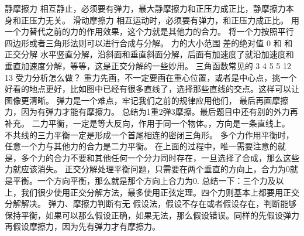 {}静摩擦力 相互静止，必须要有弹力，最大静摩擦力和正压力成正比，静摩擦力本身和正压力无关。\markdownRendererParagraphSeparator
{}滑动摩擦力 相互运动时，必须要有弹力，和正压力成正比。\markdownRendererInterblockSeparator
{}
\markdownRendererSectionEnd \markdownRendererSectionBegin
{}\markdownRendererInterblockSeparator
{}用一个力替代之前的力的作用效果，这个力就是其他力的合力。\markdownRendererSoftLineBreak
{}将一个力按照平行四边形或者三角形法则可以进行合成与分解。\markdownRendererSoftLineBreak
{}力的大小范围 差的绝对值 0 和 和\markdownRendererParagraphSeparator
{}正交分解\markdownRendererParagraphSeparator
{}水平竖直分解，沿斜面和垂直斜面分解，后面有加速度了就沿加速度和垂直加速度分解，等等，这是正交分解的一些妙用。\markdownRendererParagraphSeparator
{}三角函数常见的\markdownRendererParagraphSeparator
{}3 4 5\markdownRendererSoftLineBreak
{}5 12 13\markdownRendererInterblockSeparator
{}
\markdownRendererSectionEnd \markdownRendererSectionBegin
{}\markdownRendererInterblockSeparator
{}受力分析怎么做？\markdownRendererParagraphSeparator
{}重力先画，不一定要画在重心位置，或者是中心点，挑一个好看的地点更好，比如图中已经有很多直线了，选择那些直线的交点。这样可以让图像更清晰。\markdownRendererParagraphSeparator
{}弹力是一个难点，牢记我们之前的规律应用他们，\markdownRendererParagraphSeparator
{}最后再画摩擦力，因为有弹力才能有摩擦力。\markdownRendererParagraphSeparator
{}总结为1重2弹3摩擦。最后题目中还有别的外力再补充。\markdownRendererParagraphSeparator
{}二力平衡，一定是等大反向，作用于同一个物体。，方向是一条直线上。\markdownRendererParagraphSeparator
{}不共线的三力平衡一定是形成一个首尾相连的密闭三角形。\markdownRendererParagraphSeparator
{}多个力作用平衡时，任意一个力与其他力的合力是二力平衡。\markdownRendererParagraphSeparator
{}在上面的过程中，唯一需要注意的就是，多个力的合力不要和其他任何一个分力同时存在，一旦选择了合成，那么这些力就应该消失。\markdownRendererParagraphSeparator
{}正交分解处理平衡问题，只需要在两个垂直的方向上，合力为0就是平衡。一个方向平衡，那么就是那个方向上合力为0.\markdownRendererParagraphSeparator
{}总结一下：三个力及以上，我们很少使用正交分解方法，最多使用正弦定理。四个力则基本上都要用正交分解解决。\markdownRendererInterblockSeparator
{}
\markdownRendererSectionEnd \markdownRendererSectionBegin
{}\markdownRendererInterblockSeparator
{}弹力、摩擦力判断有无\markdownRendererParagraphSeparator
{}假设法，假设不存在或者假设存在，判断能够保持平衡，如果可以那么假设正确，如果无法，那么假设错误。同样的先假设弹力再假设摩擦力，因为先有弹力才有摩擦力。\markdownRendererParagraphSeparator
